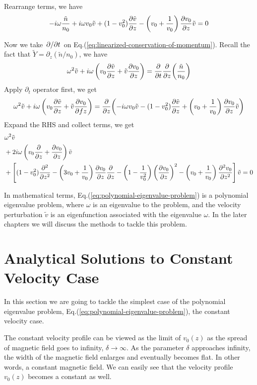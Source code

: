 Rearrange terms, we have
\[
	-i\omega\frac{\tilde{n}}{n_0}
	+ i\omega v_0\tilde{v}
	+ (1-v_0^2)\pdv{\tilde{v}}{z}
	- \left(v_0+\frac{1}{v_0}\right)\pdv{v_0}{z}\tilde{v} = 0
\]

Now we take $\pdv*{t}$ on Eq.(\ref{eq:linearized-conservation-of-momentum}). Recall the fact that $\tilde{Y} = \partial_z(\tilde{n}/n_0)$, we have
\[
	\omega^2\tilde{v} + i\omega\left(v_0\pdv{\tilde{v}}{z} + \tilde{v}\pdv{v_0}{z}\right)
	= \pdv{t}\pdv{z}(\frac{\tilde{n}}{n_0})
\]
Apply $\partial_t$ operator first, we get
\[
	\omega^2\tilde{v} + i\omega\left(v_0\pdv{\tilde{v}}{z} + \tilde{v}\pdv{v_0}{fz}\right)
	= \pdv{z}(-i\omega v_0\tilde{v}
	- (1-v_0^2)\pdv{\tilde{v}}{z}
	+ \left(v_0+\frac{1}{v_0}\right)\pdv{v_0}{z}\tilde{v})
\]
Expand the RHS and collect terms, we get
\begin{equation} \label{eq:polynomial-eigenvalue-problem}
	\begin{aligned}
		 & \omega^2 \tilde{v}                                          \\
		 & +2i\omega\left(v_0\pdv{}{z} + \pdv{v_0}{z}\right) \tilde{v} \\
		 & +\left[ (1-v_0^2)\pdv[2]{}{z}
			-\left(3v_0 + \frac{1}{v_0}\right)\pdv{v_0}{z}\pdv{}{z}
			- \left(1-\frac{1}{v_0^2}\right)\left(\pdv{v_0}{z}\right)^2
			- \left(v_0+\frac{1}{v_0}\right)\pdv[2]{v_0}{z} \right]\tilde{v}
		= 0
	\end{aligned}
\end{equation}

In mathematical terms, Eq.(\ref{eq:polynomial-eigenvalue-problem}) is a polynomial eigenvalue problem, where $\omega$ is an eigenvalue to the problem, and the velocity perturbation $\tilde{v}$ is an eigenfunction associated with the eigenvalue $\omega$. In the later chapters we will discuss the methods to tackle this problem.

\section{Analytical Solutions to Constant Velocity Case}
In this section we are going to tackle the simplest case of the polynomial eigenvalue problem, Eq.(\ref{eq:polynomial-eigenvalue-problem}), the constant velocity case.

The constant velocity profile can be viewed as the limit of $v_0(z)$ as the spread of magnetic field goes to infinity, $\delta\to\infty$. As the parameter $\delta$ approaches infinity, the width of the magnetic field enlarges and eventually becomes flat. In other words, a constant magnetic field. We can easily see that the velocity profile $v_0(z)$ becomes a constant as well.

